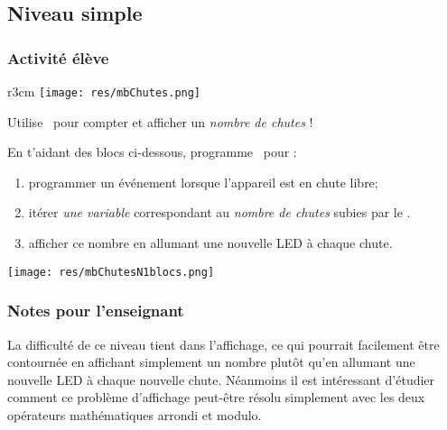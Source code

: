 %
%
\newpage
\subsection{Niveau simple}
\subsubsection{Activité élève}



\begin{wrapfigure}{r}{3cm}
    \texttt{[image: res/mbChutes.png]}
\end{wrapfigure}
\begin{eleve}
Utilise \mb~pour compter et afficher un \emph{nombre de chutes} !

En t'aidant des blocs ci-dessous, programme \mb~pour : 
\begin{enumerate}
    \item programmer un événement lorsque l'appareil est en chute libre;
    \item itérer \emph{une variable} correspondant au \emph{nombre de chutes} subies par le \mb.
    \item afficher ce nombre en allumant une nouvelle LED à chaque chute.
\end{enumerate}

\texttt{[image: res/mbChutesN1blocs.png]}

\end{eleve}

\newpage
\subsubsection{Notes pour l'enseignant}

La difficulté de ce niveau tient dans l'affichage, ce qui pourrait facilement être contournée en affichant simplement un nombre plutôt qu'en allumant une nouvelle LED à chaque nouvelle chute. Néanmoins il est intéressant d'étudier comment ce problème d'affichage peut-être résolu simplement avec les deux opérateurs mathématiques arrondi et modulo.


